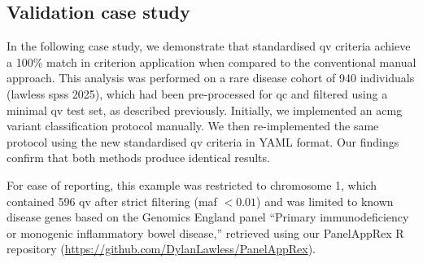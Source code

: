 %

\subsection{Validation case study}

In the following case study, we demonstrate that standardised \ac{qv} criteria achieve a 100\% match in criterion application when compared to the conventional manual approach. This analysis was performed on a rare disease cohort of 940 individuals (lawless spss 2025), which had been pre-processed for \ac{qc} and filtered using a minimal \ac{qv} test set, as described previously. Initially, we implemented an \ac{acmg} variant classification protocol \cite{richards2015standards} manually. We then re-implemented the same protocol using the new standardised \ac{qv} criteria in YAML format. Our findings confirm that both methods produce identical results.

For ease of reporting, this example was restricted to chromosome 1, which contained 596 \ac{qv} after strict filtering (\ac{maf} $< 0.01$) and was limited to known disease genes based on the Genomics England panel ``Primary immunodeficiency or monogenic inflammatory bowel disease,'' retrieved using our PanelAppRex R repository (\url{https://github.com/DylanLawless/PanelAppRex}).

